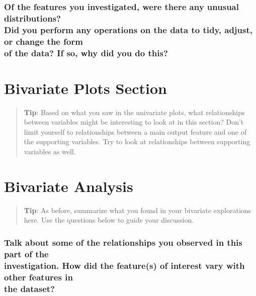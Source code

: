 \documentclass[]{article}
\begin{document}
\subsubsection{\texorpdfstring{Of the features you investigated, were
there any unusual distributions?\\
Did you perform any operations on the data to tidy, adjust, or change
the form\\
of the data? If so, why did you do
this?}{Of the features you investigated, were there any unusual distributions? Did you perform any operations on the data to tidy, adjust, or change the form of the data? If so, why did you do this?}}\label{of-the-features-you-investigated-were-there-any-unusual-distributions-did-you-perform-any-operations-on-the-data-to-tidy-adjust-or-change-the-form-of-the-data-if-so-why-did-you-do-this}

\section{Bivariate Plots Section}\label{bivariate-plots-section}

\begin{quote}
\textbf{Tip}: Based on what you saw in the univariate plots, what
relationships between variables might be interesting to look at in this
section? Don't limit yourself to relationships between a main output
feature and one of the supporting variables. Try to look at
relationships between supporting variables as well.
\end{quote}

\section{Bivariate Analysis}\label{bivariate-analysis}

\begin{quote}
\textbf{Tip}: As before, summarize what you found in your bivariate
explorations here. Use the questions below to guide your discussion.
\end{quote}

\subsubsection{\texorpdfstring{Talk about some of the relationships you
observed in this part of the\\
investigation. How did the feature(s) of interest vary with other
features in\\
the
dataset?}{Talk about some of the relationships you observed in this part of the investigation. How did the feature(s) of interest vary with other features in the dataset?}}\label{talk-about-some-of-the-relationships-you-observed-in-this-part-of-the-investigation.-how-did-the-features-of-interest-vary-with-other-features-in-the-dataset}
\end{document}
